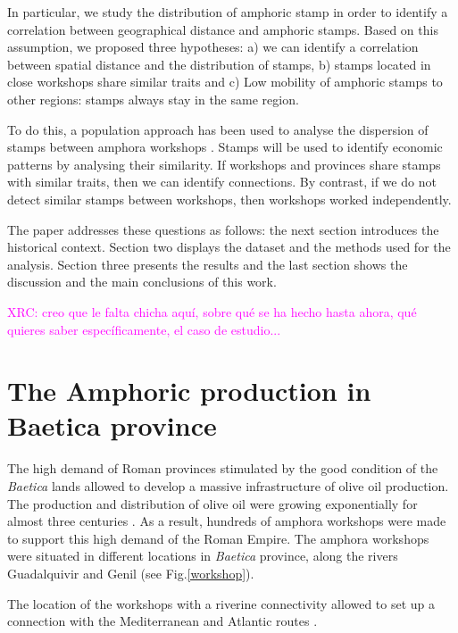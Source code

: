 \documentclass[review]{elsarticle}
\newcommand{\memo}[2]{\textcolor{#1}{#2}}
\newcommand{\xavi}[1]{\memo{magenta}{XRC: #1\\}}
\begin{document}
In particular, we study the distribution of amphoric stamp in order to identify a correlation between geographical distance and amphoric stamps. Based on this assumption, we proposed three hypotheses: a) we can identify a correlation between spatial distance and the distribution of stamps, b) stamps located in close workshops share similar traits and c) Low mobility of amphoric stamps to other regions: stamps always stay in the same region.  


To do this, a population approach has been used to analyse the dispersion of stamps between amphora workshops \citep{rubio-campillo_ecology_2018}. Stamps will be used to identify economic patterns by analysing their similarity. If workshops and provinces share stamps with similar traits, then we can identify connections. By contrast, if we do not detect similar stamps between workshops, then workshops worked independently. 


The paper addresses these questions as follows: the next section introduces the historical context. Section two displays the dataset and the methods used for the analysis. Section three presents the results and the last section shows the discussion and the main conclusions of this work. 
 
\xavi{creo que le falta chicha aquí, sobre qué se ha hecho hasta ahora, qué quieres saber específicamente, el caso de estudio...}


\section{The Amphoric production in Baetica province}


The high demand of Roman provinces stimulated by the good condition of the \textit{Baetica} lands allowed to develop a massive infrastructure of olive oil production. The production and distribution of olive oil were growing exponentially for almost three centuries \citep{remesal_concierto}. As a result, hundreds of amphora workshops were made to support this high demand of the Roman Empire. The amphora workshops were situated in different locations in \textit{Baetica} province, along the rivers Guadalquivir and Genil (see Fig.\ref{workshop}).

The location of the workshops with a riverine connectivity allowed to set up a connection with the Mediterranean and Atlantic routes \citep{garcia_vargas_enrique_formal_2010}.
\end{document}
